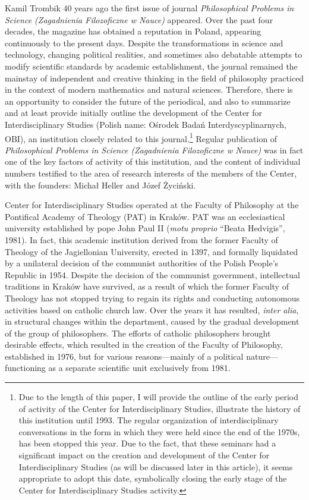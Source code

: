 \begin{artengenv}{Kamil Trombik}
\lettrine[loversize=0.13,lines=2,lraise=-0.05,nindent=3pt,findent=0.2pt]%
{40}{} years ago the first issue of journal \textit{Philosophical Problems in Science
(Zagadnienia Filozoficzne w Nauce)} appeared. Over the past four decades, the magazine has obtained a reputation in Poland,
appearing continuously to the present days. Despite the transformations in science and technology, changing political
realities, and sometimes also debatable attempts to modify scientific standards by academic establishment, the journal
remained the mainstay of independent and creative thinking in the field of philosophy practiced in the context of
modern mathematics and natural sciences. Therefore, there is an opportunity to consider the future of the periodical,
and also to summarize and at least provide initially outline the development of the Center for Interdisciplinary
Studies (Polish name: Ośrodek Badań Interdyscyplinarnych, OBI), an institution closely related to this
journal.\footnote{Due to the length of this paper, I will provide the outline of the early period of activity of the
Center for Interdisciplinary Studies, illustrate the history of this institution until 1993. The regular organization
of interdisciplinary conversations in the form in which they were held since the end of the 1970s, has been stopped
this year. Due to the fact, that these seminars had a significant impact on the creation and development of the Center
for Interdisciplinary Studies (as will be discussed later in this article), it seems appropriate to adopt this date,
symbolically closing the early stage of the Center for Interdisciplinary Studies activity.} Regular
publication of \textit{Philosophical Problems in Science (Zagadnienia Filozoficzne w
Nauce)} was in fact one of the key factors of activity of this institution, and the content of
individual numbers testified to the area of research interests of the members of the Center, with the founders: Michał
Heller and Józef Życiński.

Center for Interdisciplinary Studies operated at the Faculty of Philosophy at the Pontifical Academy of Theology (PAT)
in Kraków. PAT was an ecclesiastical university established by pope John Paul II (\textit{motu proprio} ``Beata
Hedvigis'', 1981). In fact, this academic institution derived from the former Faculty of Theology of the Jagiellonian
University, erected in 1397, and formally liquidated by a unilateral decision of the communist authorities of the
Polish People's Republic in 1954. Despite the decision of the communist government, intellectual traditions in Kraków
have survived, as a result of which the former Faculty of Theology has not stopped trying to regain its rights and
conducting autonomous activities based on catholic church law. Over the years it has resulted, \textit{inter alia}, in
structural changes within the department, caused by the gradual development of the group of philosophers. The efforts
of catholic philosophers brought desirable effects, which resulted in the creation of the Faculty of Philosophy,
established in 1976, but for various reasons---mainly of a political nature---functioning as a separate scientific unit
exclusively from 1981.


\end{artengenv}
